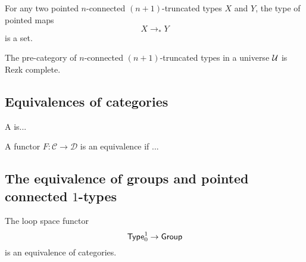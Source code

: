 \begin{cor}
  For any two pointed $n$-connected $(n+1)$-truncated types $X$ and $Y$, the type of pointed maps
  \begin{equation*}
    X\to_\ast Y
  \end{equation*}
  is a set.
\end{cor}

\begin{thm}
  The pre-category of $n$-connected $(n+1)$-truncated types in a universe $\mathcal{U}$ is Rezk complete.
\end{thm}

\subsection{Equivalences of categories}

\begin{defn}
  A  is...
\end{defn}

\begin{defn}
  A functor $F:\mathcal{C}\to\mathcal{D}$ is an equivalence if ...
\end{defn}

\subsection{The equivalence of groups and pointed connected \texorpdfstring{$1$}{1}-types}

\begin{thm}
  The loop space functor
  \begin{equation*}
    \mathsf{Type}_{0}^{1} \to \mathsf{Group}
  \end{equation*}
  is an equivalence of categories.
\end{thm}
